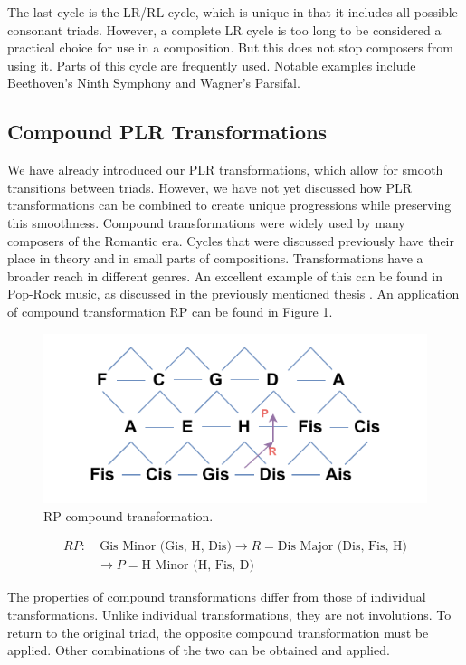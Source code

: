 The last cycle is the LR/RL cycle, which is unique in that it includes all possible consonant triads. However, a complete LR cycle is too long to be considered a practical choice for use in a composition. But this does not stop composers from using it. Parts of this cycle are frequently used. Notable examples include Beethoven’s Ninth Symphony and Wagner’s Parsifal.

\subsection*{Compound PLR Transformations}
We have already introduced our PLR transformations, which allow for smooth transitions between triads. However, we have not yet discussed how PLR transformations can be combined to create unique progressions while preserving this smoothness. Compound transformations were widely used by many composers of the Romantic era. Cycles that were discussed previously have their place in theory and in small parts of compositions. Transformations have a broader reach in different genres. An excellent example of this can be found in Pop-Rock music, as discussed in the previously mentioned thesis \cite{mansonthesis}. An application of compound transformation RP can be found in Figure \ref{fig:tonnetzRPcombined}.

\begin{figure}[H]
    \centering
    \includegraphics[scale=0.9]{obrazky-figures/tonnetzCompound.pdf}
    \caption{RP compound transformation.}
    \label{fig:tonnetzRPcombined}
\end{figure}

\[
\begin{aligned}
RP: & \ \text{Gis Minor (Gis, H, Dis)} \rightarrow R = \text{Dis Major (Dis, Fis, H)} \\ 
& \rightarrow P = \text{H Minor (H, Fis, D)}
\end{aligned}
\]

The properties of compound transformations differ from those of individual transformations. Unlike individual transformations, they are not involutions. To return to the original triad, the opposite compound transformation must be applied. Other combinations of the two can be obtained and applied.

